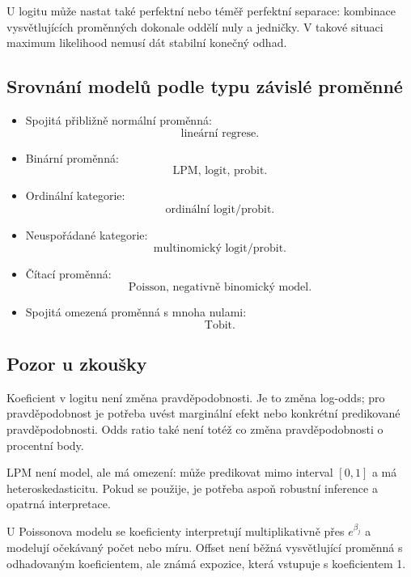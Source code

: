 U logitu může nastat také perfektní nebo téměř perfektní separace: kombinace vysvětlujících proměnných
dokonale oddělí nuly a jedničky. V takové situaci maximum likelihood nemusí dát stabilní konečný odhad.

\subsection{Srovnání modelů podle typu závislé proměnné}

\begin{itemize}
    \item Spojitá přibližně normální proměnná:
    \[
    \text{lineární regrese}.
    \]
    
    \item Binární proměnná:
    \[
    \text{LPM, logit, probit}.
    \]
    
    \item Ordinální kategorie:
    \[
    \text{ordinální logit/probit}.
    \]
    
    \item Neuspořádané kategorie:
    \[
    \text{multinomický logit/probit}.
    \]
    
    \item Čítací proměnná:
    \[
    \text{Poisson, negativně binomický model}.
    \]
    
    \item Spojitá omezená proměnná s mnoha nulami:
    \[
    \text{Tobit}.
    \]
\end{itemize}

\subsection{Pozor u zkoušky}

Koeficient v logitu není změna pravděpodobnosti. Je to změna log-odds; pro pravděpodobnost je potřeba
uvést marginální efekt nebo konkrétní predikované pravděpodobnosti. Odds ratio také není totéž co změna
pravděpodobnosti o procentní body.

LPM není  model, ale má omezení: může predikovat mimo interval $[0,1]$ a má
heteroskedasticitu. Pokud se použije, je potřeba aspoň robustní inference a opatrná interpretace.

U Poissonova modelu se koeficienty interpretují multiplikativně přes $e^{\beta_j}$ a modelují očekávaný
počet nebo míru. Offset není běžná vysvětlující proměnná s odhadovaným koeficientem, ale známá expozice,
která vstupuje s koeficientem 1.

